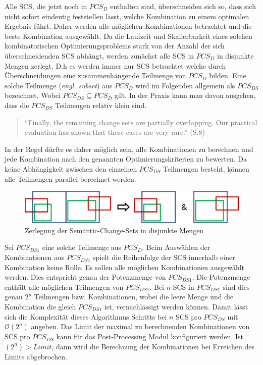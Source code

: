 Alle SCS, die jetzt noch in $PCS_D$ enthalten sind, überschneiden sich so, dass sich nicht sofort
eindeutig feststellen lässt, welche Kombination zu einem optimalen Ergebnis führt. Daher werden alle
möglichen Kombinationen betrachtet und die beste Kombination ausgewählt. Da die Laufzeit und
Skalierbarkeit eines solchen kombinatorischen Optimierungsproblems stark von der Anzahl der sich
überschneidenden SCS abhängt, werden zunächst alle SCS in $PCS_D$ in disjunkte Mengen zerlegt. D.h
es werden immer nur SCS betrachtet welche durch Überschneidungen eine zusammenhängende Teilmenge von
$PCS_D$ bilden. Eine solche Teilmenge (\textit{engl. subset}) aus $PCS_D$ wird im Folgenden
allgemein als $PCS_{DS}$ bezeichnet. Wobei $PCS_{DS} \subseteq PCS_D$ gilt. In der Praxis kann man
davon ausgehen, dass die $PCS_{DS}$ Teilmengen relativ klein sind.
\begin{quote}
"`Finally, the remaining change sets are partially overlapping. Our practical evaluation has shown
that these cases are very rare."' \cite{KeKT2011ASE} (S.8)
\end{quote}
In der Regel dürfte es daher möglich sein, alle Kombinationen zu berechnen und jede Kombination nach
den genannten Optimierungskriterien zu bewerten. Da keine Abhängigkeit zwischen den einzelnen $PCS_{DS}$
Teilmengen besteht, können alle Teilmengen parallel berechnet werden.

\begin{figure}[htb]
  \centering
  \includegraphics[width=1.0\textwidth]{images/post_processing_disjoint.png}
  \caption{Zerlegung der Semantic-Change-Sets in disjunkte Mengen}
  \label{post_processing_disjoint}
\end{figure}

Sei $PCS_{DS1}$ eine solche Teilmenge aus $PCS_D$. Beim Auswählen der Kombinationen aus $PCS_{DS1}$
spielt die Reihenfolge der SCS innerhalb einer Kombination keine Rolle. Es sollen alle möglichen
Kombinationen ausgewählt werden. Dies entspricht genau der Potenzmenge von $PCS_{DS1}$. Die
Potenzmenge enthält alle möglichen Teilmengen von $PCS_{DS1}$. Bei $n$ SCS in $PCS_{DS1}$ sind dies
genau $2^n$ Teilmengen bzw. Kombinationen, wobei die leere Menge und die Kombination die gleich
$PCS_{DS1}$ ist, vernachlässigt werden können. Damit lässt sich die Komplexität dieses Algorithmus
Schritts bei $n$ SCS pro $PCS_{DS}$ mit $\mathcal{O}(2^n)$ angeben. Das Limit der maximal zu
berechnenden Kombinationen von SCS pro $PCS_{DS}$ kann für das Post-Processing Modul konfiguriert
werden. Ist $(2^n) > Limit$, dann wird die Berechnung der Kombinationen bei Erreichen des Limits
abgebrochen. 

